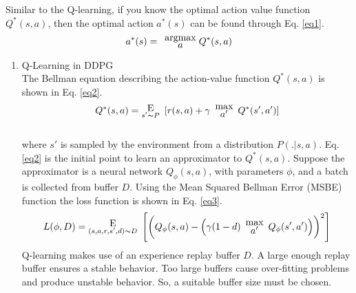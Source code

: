     Similar to the Q-learning, if you know the optimal action value function $Q^*(s, a)$, then the optimal action $a^*(s)$ can be found through Eq. \ref{eq1}.\\
    \begin{equation}
    a^*(s) = \hspace{5pt}\substack{\mathlarger{\text{argmax}} \\ \mathlarger{a}}\hspace{3pt} Q^*(s,a)
        \label{eq1}
    \end{equation}
    \begin{enumerate}[label={\alph*)}]
        \item Q-Learning in DDPG\\
        The Bellman equation describing the action-value function $Q^*(s,a)$ is shown in Eq. \ref{eq2}.\\
        \begin{equation}
    Q^*(s,a) = \substack{\mathlarger{\text{E}} \\ s' \thicksim P}\hspace{5pt} [r(s,a) + \gamma\hspace{5pt} \substack{\mathlarger{\text{max}} \\ \mathlarger{a'}}\hspace{5pt} Q^*(s',a')] 
        \label{eq2}
    \end{equation}\\
    where $s'$ is sampled by the environment from a distribution $P(.|s,a)$.
    Eq. \ref{eq2} is the initial point to learn an approximator to $Q^*(s,a)$. Suppose the approximator is a neural network $Q_{\phi}(s, a)$, with parameters $\phi$, and a batch is collected from buffer $D$. Using the Mean Squared Bellman Error (MSBE) function the loss function is shown in Eq. \ref{eq3}.\\
    \begin{equation}
    L(\phi, D) = \substack{\mathlarger{\mathlarger{\text{E}}} \\ (s, a,r,s',d) \thicksim D}\hspace{5pt} \Bigg[\bigg(Q_{\phi}(s, a) - \Big(\gamma (1-d) \hspace{5pt} \substack{\mathlarger{\text{max}} \\ \mathlarger{a'}}\hspace{5pt} Q_{\phi}(s', a')\Big)\bigg)^2\Bigg] 
        \label{eq3}
    \end{equation}
    Q-learning makes use of an experience replay buffer $D$. A large enough replay buffer ensures a stable behavior. Too large buffers cause over-fitting problems and produce unstable behavior. So, a suitable buffer size must be chosen.\\

\end{enumerate}
